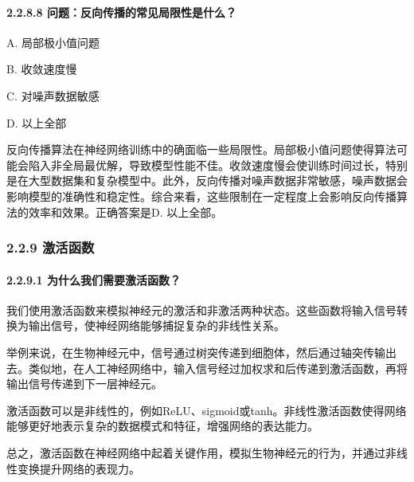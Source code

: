 \paragraph{\texorpdfstring{\textbf{2.2.8.8}
\textbf{问题：反向传播的常见局限性是什么？}}{2.2.8.8 问题：反向传播的常见局限性是什么？}}\label{2288-ux95eeux9898ux53cdux5411ux4f20ux64adux7684ux5e38ux89c1ux5c40ux9650ux6027ux662fux4ec0ux4e48}

A. 局部极小值问题

B. 收敛速度慢

C. 对噪声数据敏感

D. 以上全部

反向传播算法在神经网络训练中的确面临一些局限性。局部极小值问题使得算法可能会陷入非全局最优解，导致模型性能不佳。收敛速度慢会使训练时间过长，特别是在大型数据集和复杂模型中。此外，反向传播对噪声数据非常敏感，噪声数据会影响模型的准确性和稳定性。综合来看，这些限制在一定程度上会影响反向传播算法的效率和效果。正确答案是D.
以上全部。

\subsubsection{\texorpdfstring{\textbf{2.2.9
激活函数}}{2.2.9 激活函数}}\label{229-ux6fc0ux6d3bux51fdux6570}

\paragraph{\texorpdfstring{\textbf{2.2.9.1}
\textbf{为什么我们需要激活函数？}}{2.2.9.1 为什么我们需要激活函数？}}\label{2291-ux4e3aux4ec0ux4e48ux6211ux4eecux9700ux8981ux6fc0ux6d3bux51fdux6570}

我们使用激活函数来模拟神经元的激活和非激活两种状态。这些函数将输入信号转换为输出信号，使神经网络能够捕捉复杂的非线性关系。


举例来说，在生物神经元中，信号通过树突传递到细胞体，然后通过轴突传输出去。类似地，在人工神经网络中，输入信号经过加权求和后传递到激活函数，再将输出信号传递到下一层神经元。

激活函数可以是非线性的，例如ReLU、sigmoid或tanh。非线性激活函数使得网络能够更好地表示复杂的数据模式和特征，增强网络的表达能力。

总之，激活函数在神经网络中起着关键作用，模拟生物神经元的行为，并通过非线性变换提升网络的表现力。

